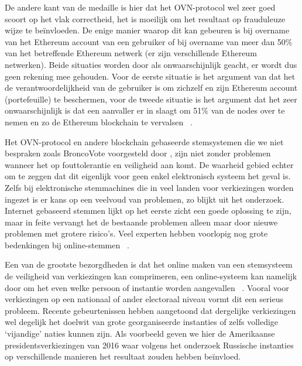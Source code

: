 	De andere kant van de medaille is hier dat het OVN-protocol wel zeer goed scoort op het vlak correctheid, het is moeilijk om het resultaat op frauduleuze wijze te beïnvloeden. De enige manier waarop dit kan gebeuren is bij overname van het Ethereum account van een gebruiker of bij overname van meer dan 50\% van het betreffende Ethereum netwerk (er zijn verschillende Ethereum netwerken). Beide situaties worden door \textcite{McCorry2017} als onwaarschijnlijk geacht, er wordt dus geen rekening mee gehouden. Voor de eerste situatie is het argument van \textcite{McCorry2017} dat het de verantwoordelijkheid van de gebruiker is om zichzelf en zijn Ethereum account (portefeuille) te beschermen, voor de tweede situatie is het argument dat het zeer onwaarschijnlijk is dat een aanvaller er in slaagt om 51\% van de nodes over te nemen en zo de Ethereum blockchain te vervalsen ~\autocite{McCorry2017}.
	
	 Het OVN-protocol en andere blockchain gebaseerde stemsystemen die we niet bespraken zoals BroncoVote voorgesteld door , zijn niet zonder problemen wanneer het op fouttolerantie en veiligheid aan komt. De waarheid gebied echter om te zeggen dat dit eigenlijk voor geen enkel elektronisch systeem het geval is. Zelfs bij elektronische stemmachines die  in veel landen voor verkiezingen worden ingezet is er kans op een veelvoud van problemen, zo blijkt uit het \textcite{Norden2015} onderzoek. Internet gebaseerd stemmen lijkt op het eerste zicht een goede oplossing te zijn, maar in feite vervangt het de bestaande problemen alleen maar door nieuwe problemen met grotere risico's. Veel experten hebben voorlopig nog grote bedenkingen bij online-stemmen ~\autocite{Norden2015}. 
	 
	 Een van de grootste bezorgdheden is dat het online maken van een stemsysteem de veiligheid van verkiezingen kan comprimeren, een online-systeem kan namelijk door om het even welke persoon of instantie worden aangevallen ~\autocite{Norden2015}. Vooral voor verkiezingen op een nationaal of ander electoraal niveau vormt dit een serieus probleem. Recente gebeurtenissen hebben aangetoond dat dergelijke verkiezingen wel degelijk het doelwit van grote georganiseerde instanties of zelfs volledige `vijandige' naties kunnen zijn. Als voorbeeld geven we hier de Amerikaanse presidentsverkiezingen van 2016 waar volgens het \textcite{Mueller2019} onderzoek Russische instanties op verschillende manieren het resultaat zouden hebben beïnvloed.
	 
